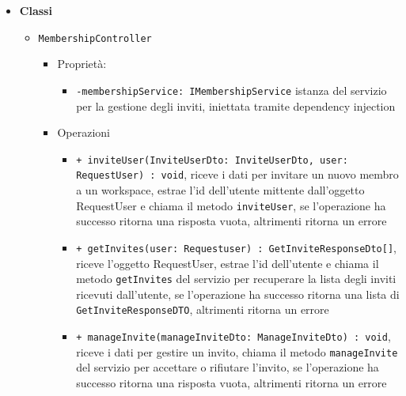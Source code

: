 \documentclass[a4paper, 11pt]{article}
\begin{document}
\begin{itemize}
	\item \textbf{Classi}
		\begin{itemize}
			\item \texttt{MembershipController}
				\begin{itemize}
					\item Proprietà:
						\begin{itemize}
							\item \texttt{-membershipService: IMembershipService} istanza del servizio per la gestione degli inviti, iniettata tramite dependency injection
						\end{itemize}
					\item Operazioni
						\begin{itemize}
							\item \texttt{+ inviteUser(InviteUserDto: InviteUserDto, user: RequestUser) : void}, riceve i dati per invitare un nuovo membro a un workspace, estrae l'id dell'utente mittente dall'oggetto RequestUser e chiama il metodo \texttt{inviteUser}, se l'operazione ha successo ritorna una risposta vuota, altrimenti ritorna un errore
							\item \texttt{+ getInvites(user: Requestuser) : GetInviteResponseDto[]}, riceve l'oggetto RequestUser, estrae l'id dell'utente e chiama il metodo \texttt{getInvites} del servizio per recuperare la lista degli inviti ricevuti dall'utente, se l'operazione ha successo ritorna una lista di \texttt{GetInviteResponseDTO}, altrimenti ritorna un errore
							\item \texttt{+ manageInvite(manageInviteDto: ManageInviteDto) : void}, riceve i dati per gestire un invito, chiama il metodo \texttt{manageInvite} del servizio per accettare o rifiutare l'invito, se l'operazione ha successo ritorna una risposta vuota, altrimenti ritorna un errore
						\end{itemize}
				\end{itemize}

			


\end{itemize}
\end{itemize}
\end{document}
